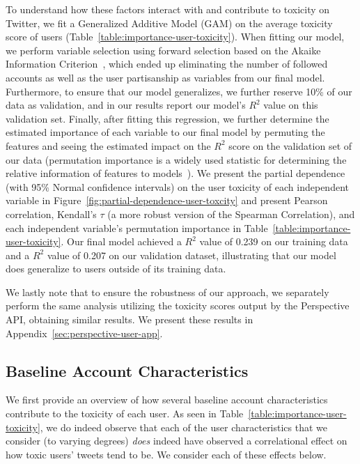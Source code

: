 To understand how these factors interact with and contribute to toxicity on Twitter, we fit a Generalized Additive Model (GAM) on the average toxicity score of users (Table~\ref{table:importance-user-toxicity}). When fitting our model, we perform variable selection using forward selection based on the Akaike Information Criterion~\cite{akaike2011akaike}, which ended up eliminating the number of followed accounts as well as the user partisanship as variables from our final model. Furthermore, to ensure that our model generalizes, we further reserve 10\% of our data as validation, and in our results report our model's $R^2$ value on this validation set. Finally, after fitting this regression, we further determine the estimated importance of each variable to our final model by permuting the features and seeing the estimated impact on the $R^2$ score on the validation set of our data (permutation importance is a widely used statistic for determining the relative information of features to models~\cite{altmann2010permutation}). We present the partial dependence (with 95\% Normal confidence intervals) on the user toxicity of each independent variable in Figure~\ref{fig:partial-dependence-user-toxcity} and present Pearson correlation, Kendall's $\tau$  (a more robust version of the Spearman Correlation), and each independent variable's permutation importance in Table~\ref{table:importance-user-toxicity}.  Our final model achieved a $R^2$ value of 0.239 on our training data and a $R^2$ value of 0.207 on our validation dataset, illustrating that our model does generalize to users outside of its training data.


We lastly note that to ensure the robustness of our approach, we separately perform the same analysis utilizing the toxicity scores output by the Perspective API, obtaining similar results. We present these results in Appendix~\ref{sec:perspective-user-app}.

\subsection{Baseline Account Characteristics}
We first provide an overview of how several baseline account characteristics contribute to the toxicity of each user. As seen in Table~\ref{table:importance-user-toxicity}, we do indeed observe that each of the user characteristics that we consider (to varying degrees) \emph{does} indeed have observed a correlational effect on how toxic users' tweets tend to be. We consider each of these effects below.

